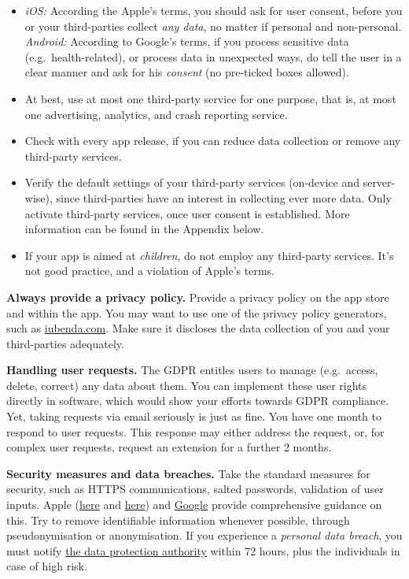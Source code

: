 \documentclass[
]{book}
\providecommand{\tightlist}{%
  \setlength{\itemsep}{0pt}\setlength{\parskip}{0pt}}
\begin{document}
\begin{itemize}
\tightlist
\item
  \emph{iOS:} According the Apple's terms, you should ask for user consent, before you or your third-parties collect \emph{any data}, no matter if personal and non-personal.
  \emph{Android:} According to Google's terms, if you process sensitive data (e.g.~health-related), or process data in unexpected ways, do tell the user in a clear manner and ask for his \emph{consent} (no pre-ticked boxes allowed).
\item
  At best, use at most one third-party service for one purpose, that is, at most one advertising, analytics, and crash reporting service.
\item
  Check with every app release, if you can reduce data collection or remove any third-party services.
\item
  Verify the default settings of your third-party services (on-device and server-wise), since third-parties have an interest in collecting ever more data. Only activate third-party services, once user consent is established. More information can be found in the Appendix below.
\item
  If your app is aimed at \emph{children}, do not employ any third-party services. It's not good practice, and a violation of Apple's terms.
\end{itemize}

\textbf{Always provide a privacy policy.} Provide a privacy policy on the app store and within the app. You may want to use one of the privacy policy generators, such as \href{https://gdpr4devs.com/iubenda.com}{iubenda.com}. Make sure it discloses the data collection of you and your third-parties adequately.

\textbf{Handling user requests.} The GDPR entitles users to manage (e.g.~access, delete, correct) any data about them. You can implement these user rights directly in software, which would show your efforts towards GDPR compliance. Yet, taking requests via email seriously is just as fine. You have one month to respond to user requests. This response may either address the request, or, for complex user requests, request an extension for a further 2 months.

\textbf{Security measures and data breaches.} Take the standard measures for security, such as HTTPS communications, salted passwords, validation of user inputs. Apple (\href{https://developer.apple.com/documentation/security}{here} and \href{https://developer.apple.com/library/archive/documentation/Security/Conceptual/SecureCodingGuide}{here}) and \href{https://developer.android.com/training/articles/security-tips}{Google} provide comprehensive guidance on this. Try to remove identifiable information whenever possible, through pseudonymisation or anonymisation. If you experience a \emph{personal data breach}, you must notify \href{https://edpb.europa.eu/about-edpb/board/members}{the data protection authority} within 72 hours, plus the individuals in case of high risk.
\end{document}
